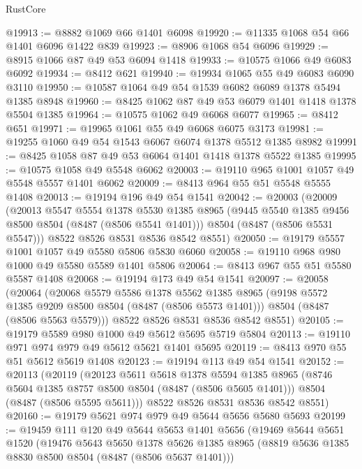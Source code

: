\begin{lexlean}{RustCore}
\begin{coremodule}
@19913 := @8882 @1069 @66 @1401 @6098
@19920 := @11335 @1068 @54 @66 @1401 @6096 @1422 @839
@19923 := @8906 @1068 @54 @6096
@19929 := @8915 @1066 @87 @49 @53 @6094 @1418
@19933 := @10575 @1066 @49 @6083 @6092
@19934 := @8412 @621
@19940 := @19934 @1065 @55 @49 @6083 @6090 @3110
@19950 := @10587 @1064 @49 @54 @1539 @6082 @6089 @1378 @5494 @1385 @8948
@19960 := @8425 @1062 @87 @49 @53 @6079 @1401 @1418 @1378 @5504 @1385
@19964 := @10575 @1062 @49 @6068 @6077
@19965 := @8412 @651
@19971 := @19965 @1061 @55 @49 @6068 @6075 @3173
@19981 := @19255 @1060 @49 @54 @1543 @6067 @6074 @1378 @5512 @1385 @8982
@19991 := @8425 @1058 @87 @49 @53 @6064 @1401 @1418 @1378 @5522 @1385
@19995 := @10575 @1058 @49 @5548 @6062
@20003 := @19110 @965 @1001 @1057 @49 @5548 @5557 @1401 @6062
@20009 := @8413 @964 @55 @51 @5548 @5555 @1408
@20013 := @19194 @196 @49 @54 @1541
@20042 := @20003
    (@20009
      (@20013
        @5547
        @5554
        @1378
        @5530
        @1385
        @8965
        (@9445 @5540 @1385 @9456 @8500 @8504 (@8487 (@8506 @5541 @1401)))
        @8504
        (@8487 (@8506 @5531 @5547)))
      @8522
      @8526
      @8531
      @8536
      @8542
      @8551)
@20050 := @19179 @5557 @1001 @1057 @49 @5580 @5806 @5830 @6060
@20058 := @19110 @968 @980 @1000 @49 @5580 @5589 @1401 @5806
@20064 := @8413 @967 @55 @51 @5580 @5587 @1408
@20068 := @19194 @173 @49 @54 @1541
@20097 := @20058
    (@20064
      (@20068
        @5579
        @5586
        @1378
        @5562
        @1385
        @8965
        (@9198 @5572 @1385 @9209 @8500 @8504 (@8487 (@8506 @5573 @1401)))
        @8504
        (@8487 (@8506 @5563 @5579)))
      @8522
      @8526
      @8531
      @8536
      @8542
      @8551)
@20105 := @19179 @5589 @980 @1000 @49 @5612 @5695 @5719 @5804
@20113 := @19110 @971 @974 @979 @49 @5612 @5621 @1401 @5695
@20119 := @8413 @970 @55 @51 @5612 @5619 @1408
@20123 := @19194 @113 @49 @54 @1541
@20152 := @20113
    (@20119
      (@20123
        @5611
        @5618
        @1378
        @5594
        @1385
        @8965
        (@8746 @5604 @1385 @8757 @8500 @8504 (@8487 (@8506 @5605 @1401)))
        @8504
        (@8487 (@8506 @5595 @5611)))
      @8522
      @8526
      @8531
      @8536
      @8542
      @8551)
@20160 := @19179 @5621 @974 @979 @49 @5644 @5656 @5680 @5693
@20199 := @19459
    @111
    @120
    @49
    @5644
    @5653
    @1401
    @5656
    (@19469
      @5644
      @5651
      @1520
      (@19476
        @5643
        @5650
        @1378
        @5626
        @1385
        @8965
        (@8819 @5636 @1385 @8830 @8500 @8504 (@8487 (@8506 @5637 @1401)))

\end{coremodule}
\end{lexlean}
